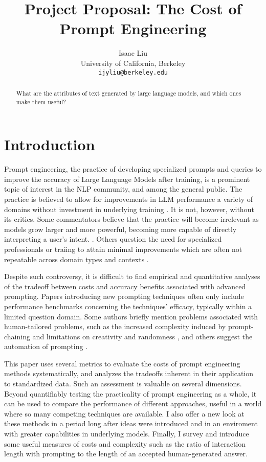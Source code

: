 \documentclass[11pt]{article}
\title{Project Proposal: The Cost of Prompt Engineering}
\author{Isaac Liu \\
  University of California, Berkeley \\
  \texttt{ijyliu@berkeley.edu}}
\begin{document}
\maketitle
\begin{abstract}
What are the attributes of text generated by large language models, and which ones make them useful?
\end{abstract}

\section{Introduction}

Prompt engineering, the practice of developing specialized prompts and queries to improve the accuracy of Large Language Models after training, is a prominent topic of interest in the NLP community, and among the general public. The practice is believed to allow for improvements in LLM performance a variety of domains without investment in underlying training \cite{martineau_what_2021}. It is not, however, without its critics. Some commentators believe that the practice will become irrelevant as models grow larger and more powerful, becoming more capable of directly interpreting a user's intent. \cite{ethan_mollick_emollick_i_2023}. Others question the need for specialized professionals or traiing to attain minimal improvements which are often not repeatable across domain types and contexts \cite{shackell_prompt_2023, acar_ai_2023}. 

Despite such controversy, it is difficult to find empirical and quantitative analyses of the tradeoff between costs and accuracy benefits associated with advanced prompting. Papers introducing new prompting techniques often only include performance benchmarks concerning the techniques' efficacy, typically within a limited question domain. Some authors briefly mention problems associated with human-tailored problems, such as the increased complexity induced by prompt-chaining and limitations on creativity and randomness \cite{wu_ai_2022}, and others suggest the automation of prompting \cite{diao_active_2023}.

This paper uses several metrics to evaluate the costs of prompt engineering methods systematically, and analyzes the tradeoffs inherent in their application to standardized data. Such an assessment is valuable on several dimensions. Beyond quantifiably testing the practicality of prompt engineering as a whole, it can be used to compare the performance of different approaches, useful in a world where so many competing techniques are available. I also offer a new look at these methods in a period long after ideas were introduced and in an enviroment with greater capabilities in underlying models. Finally, I survey and introduce some useful measures of costs and complexity such as the ratio of interaction length with prompting to the length of an accepted human-generated answer.
\end{document}
